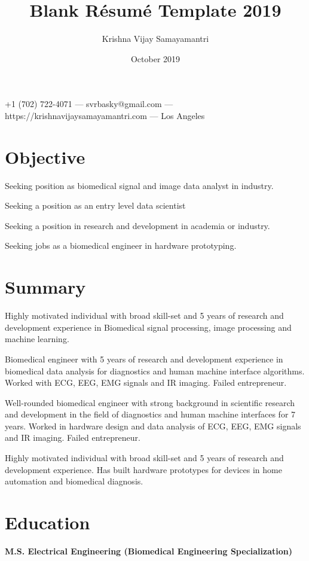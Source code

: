 \documentclass{article}
\makeatletter
\renewcommand{\maketitle}{
\begin{center}
    {\huge\bfseries
    \theauthor}
    
    \vspace{.25em}
    +1 (702) 722-4071 ---
    svrbasky@gmail.com --- https://krishnavijaysamayamantri.com ---
    Los Angeles
\end{center}
}
\makeatother
\begin{document}
\title{Blank R\'esum\'e Template 2019}
\author{Krishna Vijay Samayamantri}
\date{October 2019}
\maketitle


\section{Objective}
Seeking position as biomedical signal and image data analyst in industry. 

\noindent Seeking a position as an entry level data scientist 

\noindent Seeking a position in research and development in academia or industry.

\noindent Seeking jobs as a biomedical engineer in hardware prototyping.

\section{Summary}
\noindent
Highly motivated individual with broad skill-set and 5 years of research and development experience in Biomedical signal processing, image processing and machine learning.

\noindent
Biomedical engineer with 5 years of research and development experience in biomedical data analysis for diagnostics and human machine interface algorithms. Worked with ECG, EEG, EMG signals and IR imaging. Failed entrepreneur.

\noindent
Well-rounded biomedical engineer with strong background in scientific research and development in the field of diagnostics and human machine interfaces for 7 years. Worked in hardware design and data analysis of ECG, EEG, EMG signals and IR imaging. Failed entrepreneur.

\noindent
Highly motivated individual with broad skill-set and 5 years of research and development experience. Has built hardware prototypes for devices in home automation and biomedical diagnosis.

\section{Education}
\textbf{M.S. Electrical Engineering (Biomedical Engineering Specialization)}
\end{document}

